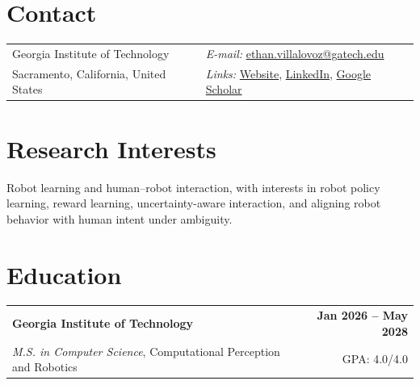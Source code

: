 \documentclass[margin,line]{res}
\begin{document}



\begin{resume}
\section{\sc Contact}
\vspace{.05in}
\begin{tabularx}{\textwidth}{@{}X l@{}}
Georgia Institute of Technology & {\it E-mail:} \href{mailto:ethan.villalovoz@gatech.edu}{\textcolor{cvblue}{ethan.villalovoz@gatech.edu}} \\
Sacramento, California, United States & {\it Links:} \href{https://ethanvillalovoz.com}{\textcolor{cvblue}{Website}}, \href{https://www.linkedin.com/in/ethanvillalovoz/}{\textcolor{cvblue}{LinkedIn}}, \href{https://scholar.google.com/citations?user=CavKFp4AAAAJ\&hl=en}{\textcolor{cvblue}{Google Scholar}} \\
\end{tabularx}


\section{\sc Research Interests}
Robot learning and human--robot interaction, with interests in robot policy learning, reward learning, uncertainty-aware interaction, and aligning robot behavior with human intent under ambiguity.


\section{\sc Education}

\begin{tabularx}{\textwidth}{@{}X r@{}}
\textbf{Georgia Institute of Technology} & \textbf{Jan 2026 -- May 2028} \\
\emph{M.S. in Computer Science}, Computational Perception and Robotics & GPA: 4.0/4.0 \\
\end{tabularx}


\end{resume}
\end{document}
